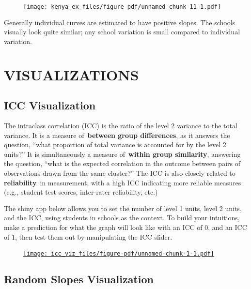 \documentclass[
  letterpaper,
  DIV=11,
  numbers=noendperiod]{scrreprt}
\begin{document}
\begin{figure}[H]

{\centering \texttt{[image: kenya\_ex\_files/figure-pdf/unnamed-chunk-11-1.pdf]}

}

\end{figure}

Generally individual curves are estimated to have positive slopes. The
schools visually look quite similar; any school variation is small
compared to individual variation.

\part{VISUALIZATIONS}

\hypertarget{icc-visualization}{%
\chapter{ICC Visualization}\label{icc-visualization}}

The intraclass correlation (ICC) is the ratio of the level 2 variance to
the total variance. It is a measure of~\textbf{between group
differences}, as it answers the question, ``what proportion of total
variance is accounted for by the level 2 units?'' It is simultaneously a
measure of~\textbf{within group similarity}, answering the question,
``what is the expected correlation in the outcome between pairs of
observations drawn from the same cluster?'' The ICC is also closely
related to \textbf{reliability}~in measurement, with a high ICC
indicating more reliable measures (e.g., student test scores,
inter-rater reliability, etc.)

The shiny app below allows you to set the number of level 1 units, level
2 units, and the ICC, using students in schools as the context. To build
your intuitions, make a prediction for what the graph will look like
with an ICC of 0, and an ICC of 1, then test them out by manipulating
the ICC slider.

\begin{figure}

{\centering 

\href{https://s43dnt-josh-gilbert.shinyapps.io/s43_icc_viz/}{\texttt{[image: icc\_viz\_files/figure-pdf/unnamed-chunk-1-1.pdf]}}

}

\end{figure}

\hypertarget{random-slopes-visualization}{%
\chapter{Random Slopes
Visualization}\label{random-slopes-visualization}}
\end{document}
